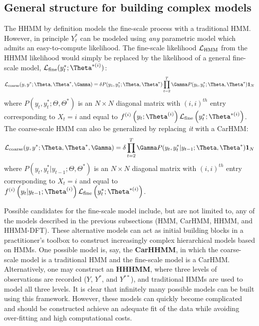 
\subsection{General structure for building complex models}

The HHMM by definition models the fine-scale process with a traditional HMM. However, in principle $Y^*_t$ can be modeled using \textit{any} parametric model which admits an easy-to-compute likelihood. The fine-scale likelihood $\mathcal{L}_{\text{HMM}}$ from the HHMM likelihood would simply be replaced by the likelihood of a general fine-scale model, $\calL_{\text{fine}}(y^*_t;\Theta^{*(i)})$:
\[
\calL_{\text{coarse}}(y,y^*;\Theta,\Theta^*,\Gamma) = \delta P(y_1,y^*_1;\Theta,\Theta^*) \prod_{t=2}^T \Gamma P(y_t,y^*_t;\Theta,\Theta^*) \mathbf{1}_N
\]
where $P(y_t,y^*_t;\Theta,\Theta^*) $ is an $N \times N$ diagonal matrix with $(i,i)^{th}$ entry corresponding to $X_t=i$ and equal to $f^{(i)}\left(y_t;\Theta^{(i)}\right)\calL_{\text{fine}}\left(y^*_t;\Theta^{*(i)}\right)$. The coarse-scale HMM can also be generalized by replacing \textit{it} with a CarHMM:
\[
\calL_{\text{coarse}}(y,y^*;\Theta,\Theta^*,\Gamma) = \delta \prod_{t=2}^T \Gamma P(y_t,y^*_t|y_{t-1};\Theta,\Theta^*) \mathbf{1}_N
\]
where $P(y_t,y^*_t|y_{t-1};\Theta,\Theta^*) $ is an $N \times N$ diagonal matrix with $(i,i)^{th}$ entry corresponding to $X_t=i$ and equal to $f^{(i)}\left(y_t|y_{t-1};\Theta^{(i)}\right)\calL_{\text{fine}}\left(y^*_t;\Theta^{*(i)}\right)$.

Possible candidates for the fine-scale model include, but are not limited to, any of the models described in the previous subsections (HMM, CarHMM, HHMM, and HHMM-DFT). These alternative models can act as initial building blocks in a practitioner's toolbox to construct increasingly complex hierarchical models based on HMMs. One possible model is, say, the \textbf{CarHHMM}, in which the coarse-scale model is a traditional HMM and the fine-scale model is a CarHMM. Alternatively, one may construct an \textbf{HHHMM}, where three levels of observations are recorded ($Y$, $Y^*$, and $Y^{**}$), and traditional HMMs are used to model all three levels. It is clear that infinitely many possible models can be built using this framework. However, these models can quickly become complicated and should be constructed achieve an adequate fit of the data while avoiding over-fitting and high computational costs.
